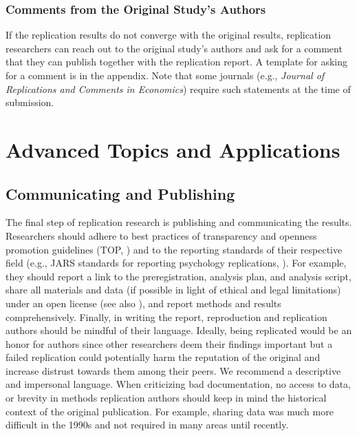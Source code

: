 \documentclass[
  letterpaper,
  DIV=11,
  openany,
  fontsize=12pt,
  parskip=half,
  headings=big,
  numbers=noenddot,
  titlepage=false]{scrreprt}
\begin{document}
\section{Comments from the Original Study's
Authors}\label{comments-from-the-original-studys-authors}

If the replication results do not converge with the original results,
replication researchers can reach out to the original study's authors
and ask for a comment that they can publish together with the
replication report. A template for asking for a comment is in the
appendix. Note that some journals (e.g., \emph{Journal of Replications
and Comments in Economics}) require such statements at the time of
submission.

\part{Advanced Topics and Applications}

\chapter{Communicating and
Publishing}\label{communicating-and-publishing}

The final step of replication research is publishing and communicating
the results. Researchers should adhere to best practices of transparency
and openness promotion guidelines (TOP,
) and to the reporting
standards of their respective field (e.g., JARS standards for reporting
psychology replications, ). For example, they should report a link to the preregistration,
analysis plan, and analysis script, share all materials and data (if
possible in light of ethical and legal limitations) under an open
license (see also ),
and report methods and results comprehensively. Finally, in writing the
report, reproduction and replication authors should be mindful of their
language. Ideally, being replicated would be an honor for authors since
other researchers deem their findings important but a failed replication
could potentially harm the reputation of the original and increase
distrust towards them among their peers. We recommend a descriptive and
impersonal language. When criticizing bad documentation, no access to
data, or brevity in methods replication authors should keep in mind the
historical context of the original publication. For example, sharing
data was much more difficult in the 1990s and not required in many areas
until recently.
\end{document}
